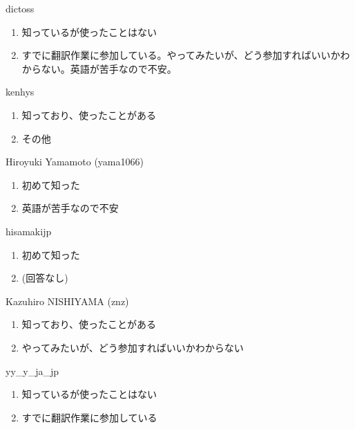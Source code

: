 \begin{prework}{ dictoss }
  \begin{enumerate}
  \item 知っているが使ったことはない
  \item すでに翻訳作業に参加している。やってみたいが、どう参加すればいいかわからない。英語が苦手なので不安。
  \end{enumerate}
\end{prework}

\begin{prework}{ kenhys }
  \begin{enumerate}
  \item 知っており、使ったことがある
  \item その他
  \end{enumerate}
\end{prework}

\begin{prework}{ Hiroyuki Yamamoto (yama1066) }
  \begin{enumerate}
  \item 初めて知った
  \item 英語が苦手なので不安
  \end{enumerate}
\end{prework}

\begin{prework}{ hisamakijp }
  \begin{enumerate}
  \item 初めて知った
  \item (回答なし)
  \end{enumerate}
\end{prework}

\begin{prework}{ Kazuhiro NISHIYAMA (znz) }
  \begin{enumerate}
  \item 知っており、使ったことがある
  \item やってみたいが、どう参加すればいいかわからない
  \end{enumerate}
\end{prework}

\begin{prework}{ yy\_y\_ja\_jp }
  \begin{enumerate}
  \item 知っているが使ったことはない
  \item すでに翻訳作業に参加している
  \end{enumerate}
\end{prework}

